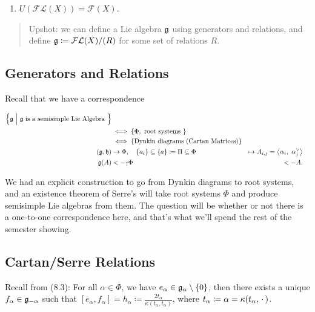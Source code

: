 \begin{enumerate}
\def\labelenumi{\alph{enumi}.}
\setcounter{enumi}{1}
\tightlist
\item
  \(U(\mathcal{FL}(X)) = \mathcal{F}(X)\).
\end{enumerate}

\begin{quote}
Upshot: we can define a Lie algebra \({\mathfrak{g}}\) using generators and
relations, and define \({\mathfrak{g}} \coloneqq \mathcal{FL}(X) / (R)\) for some
set of relations \(R\).
\end{quote}

\hypertarget{generators-and-relations}{%
\subsection{Generators and Relations}\label{generators-and-relations}}

Recall that we have a correspondence

\begin{align*}
\left\{{{\mathfrak{g}} {~\mathrel{\Big|}~} {\mathfrak{g}} \text{ is a semisimple Lie Algebra }}\right\} & &\\ 
&\iff \left\{{\Phi, \text{ root systems }}\right\} & & \\
&\iff \left\{{\text{Dynkin diagrams (Cartan Matrices)}}\right\} \\
({\mathfrak{g}}, {\mathfrak{h}}) &\to \Phi,\quad \left\{{a_i}\right\} \subseteq \left\{{a}\right\} \coloneqq \Pi \subseteq \Phi &\mapsto A_{i, j} = {\left\langle {\alpha_i},~{\alpha_j^\vee} \right\rangle} \\
{\mathfrak{g}}(A) &<-_? \Phi &<- A
.\end{align*}

We had an explicit construction to go from Dynkin diagrams to root
systems, and an existence theorem of Serre's will take root systems
\(\Phi\) and produce semisimple Lie algebras from them. The question
will be whether or not there is a one-to-one correspondence here, and
that's what we'll spend the rest of the semester showing.

\hypertarget{cartanserre-relations}{%
\subsection{Cartan/Serre Relations}\label{cartanserre-relations}}

Recall from (8.3): For all \(\alpha \in \Phi\), we have
\(e_\alpha \in {\mathfrak{g}}_\alpha \setminus\left\{{0}\right\}\), then there exists a
unique \(f_\alpha \in {\mathfrak{g}}_{-\alpha}\) such that
\([e_\alpha, f_\alpha] = h_\alpha \coloneqq \frac{2t_\alpha} {\kappa(t_\alpha, t_\alpha)}\),
where \(t_\alpha \coloneqq \alpha = \kappa(t_\alpha, {\,\cdot\,})\).


